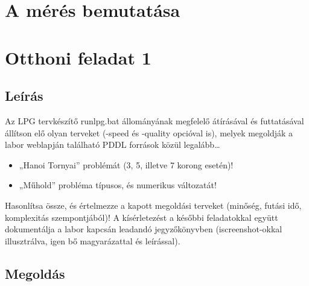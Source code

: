 
\section{A mérés bemutatása}


\section{Otthoni feladat 1}
\subsection{Leírás}
Az LPG tervkészítő runlpg.bat állományának megfelelő átírásával és futtatásával állítson elő olyan terveket (-speed és -quality opcióval is), melyek megoldják a labor weblapján található PDDL források közül legalább… 
\begin{itemize}
\item „Hanoi Tornyai” problémát (3, 5, illetve 7 korong esetén)! 
\item „Műhold” probléma típusos, és numerikus változatát!
\end{itemize}
Hasonlítsa össze, és értelmezze a kapott megoldási terveket (minőség, futási idő, komplexitás szempontjából)!  A kísérletezést a későbbi feladatokkal együtt dokumentálja a labor kapcsán leadandó jegyzőkönyvben (iscreenshot-okkal illusztrálva, igen bő magyarázattal és leírással). 
\subsection{Megoldás}

